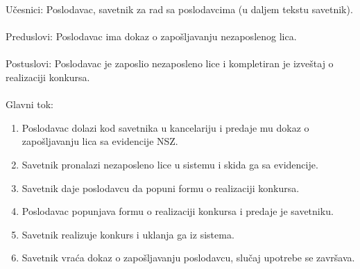 \noindent U\v cesnici: Poslodavac, savetnik za rad sa poslodavcima (u daljem tekstu savetnik).
\\
\\ Preduslovi: Poslodavac ima dokaz o zapo\v sljavanju nezaposlenog lica.
\\
\\ Postuslovi: Poslodavac je zaposlio nezaposleno lice i kompletiran je izve\v staj o realizaciji konkursa.
\\
\\ Glavni tok:
\begin{enumerate}
\item Poslodavac dolazi kod savetnika u kancelariju i predaje mu dokaz o zapo\v sljavanju lica sa evidencije NSZ.
\item Savetnik pronalazi nezaposleno lice u sistemu i skida ga sa evidencije.
\item Savetnik daje poslodavcu da popuni formu o realizaciji konkursa.
\item Poslodavac popunjava  formu o realizaciji konkursa i predaje je savetniku.
\item Savetnik realizuje konkurs i uklanja ga iz sistema.
\item Savetnik vra\' ca dokaz o zapo\v sljavanju  poslodavcu, slu\v caj upotrebe se zavr\v sava.
\end{enumerate}

